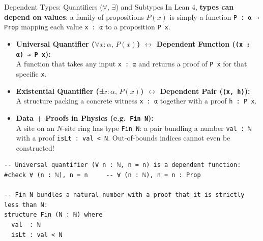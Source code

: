 \documentclass[aspectratio=169, 10pt]{beamer}
\begin{document}
\begin{frame}[fragile]{Dependent Types: Quantifiers ($\forall$, $\exists$) and Subtypes}
  In Lean 4, \textbf{types can depend on values}: a family of propositions $P(x)$ is simply a function \texttt{P : α → Prop} mapping each value \texttt{x : α} to a proposition \texttt{P x}.

  \vspace{0.15cm}
  \begin{itemize}
    \item \textbf{Universal Quantifier ($\forall x : \alpha,\, P(x)$) $\longleftrightarrow$ Dependent Function (\texttt{(x : α) → P x}):} \\
      A function that takes any input \texttt{x : α} and returns a proof of \texttt{P x} for that specific \texttt{x}.

    \item \textbf{Existential Quantifier ($\exists x : \alpha,\, P(x)$) $\longleftrightarrow$ Dependent Pair (\texttt{⟨x, h⟩}):} \\
      A structure packing a concrete witness \texttt{x : α} together with a proof \texttt{h : P x}.

    \item \textbf{Data + Proofs in Physics (e.g.\ \texttt{Fin N}):} \\
      A site on an $N$-site ring has type \texttt{Fin N}: a pair bundling a number \texttt{val : ℕ} with a proof \texttt{isLt : val < N}. Out-of-bounds indices cannot even be constructed!
  \end{itemize}

  \vspace{0.1cm}
\begin{lstlisting}[language=Lean4]
-- Universal quantifier (∀ n : ℕ, n = n) is a dependent function:
#check ∀ (n : ℕ), n = n     -- ∀ (n : ℕ), n = n : Prop

-- Fin N bundles a natural number with a proof that it is strictly less than N:
structure Fin (N : ℕ) where
  val  : ℕ
  isLt : val < N
\end{lstlisting}
\end{frame}

\end{document}
